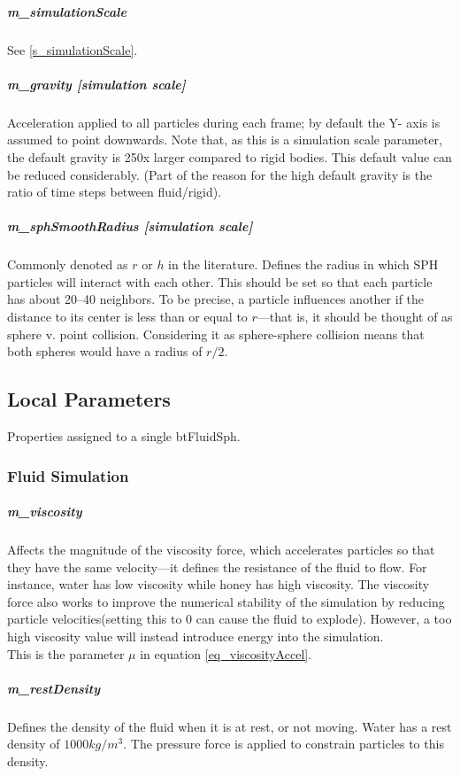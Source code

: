 \documentclass[]{article}
\begin{document}
		\subparagraph{m\_simulationScale}
			See \ref{s_simulationScale}.
		
		\subparagraph{m\_gravity [simulation scale] }
			Acceleration applied to all particles during each frame; by default the Y- axis is assumed to point downwards.
			Note that, as this is a simulation scale parameter, the default gravity is 250x larger compared to rigid bodies. 
			This default value can be reduced considerably. (Part of the reason for the high default gravity is the ratio of 
			time steps between fluid/rigid).
		
		\subparagraph{m\_sphSmoothRadius [simulation scale]}
			Commonly denoted as \(r\) or \(h\) in the literature. Defines the radius in which SPH particles will 
			interact with each other. This should be set so that each particle has about 20--40 neighbors. To be precise, 
			a particle influences another if the distance to its center is less than or equal to \(r\)---that is, it 
			should be thought of as sphere v. point collision. Considering it as sphere-sphere collision means that both
			spheres would have a radius of \(r/2\).
		
	\subsection{Local Parameters}
		Properties assigned to a single btFluidSph.

		\subsubsection{Fluid Simulation}
			\subparagraph{m\_viscosity}
				Affects the magnitude of the viscosity force, which accelerates particles so that they have the
				same velocity---it defines the resistance of the fluid to flow. For instance, water has low viscosity while 
				honey has high viscosity. The viscosity force also works to improve the numerical stability of the simulation
				by reducing particle velocities(setting this to 0 can cause the fluid to explode). However, a too high viscosity 
				value will instead introduce energy into the simulation.\\
				
				This is the parameter \(\mu\) in equation \ref{eq_viscosityAccel}.
			
			\subparagraph{m\_restDensity}
				Defines the density of the fluid when it is at rest, or not moving. Water has a rest density
				of \(1000 kg / m^3\). The pressure force is applied to constrain particles to this density.
				
\end{document}
